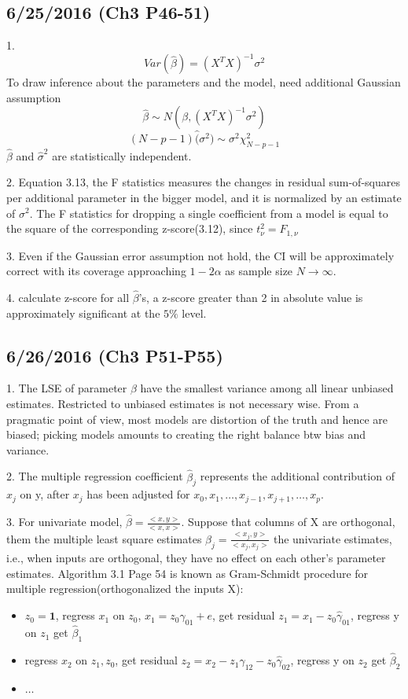 \documentclass[a4paper, 12pt]{article}
\begin{document}
\subsection*{6/25/2016 (Ch3 P46-51)}

1.$$Var(\hat{\beta})=(X^TX)^{-1}\sigma^2$$
To  draw inference about the parameters and the  model, need additional Gaussian assumption
$$\hat{\beta} \sim N(\beta,(X^TX)^{-1}\sigma^2 )$$
$$(N-p-1)\hat(\sigma^2) \sim \sigma^2\chi^2_{N-p-1}$$
$\hat{\beta}$ and $\hat{\sigma}^2$ are statistically independent.

2. Equation 3.13, the F statistics measures the changes in residual sum-of-squares per additional parameter in the bigger model, and it is normalized by an estimate of $\sigma^2$. The F statistics for dropping a single coefficient from a model is equal to the square of the corresponding z-score(3.12), since $t_{\nu}^2=F_{1,\nu}$

3. Even if the Gaussian error assumption not hold, the CI will be approximately correct with its coverage approaching $1-2\alpha$ as sample size $N \rightarrow \infty$.

4. calculate z-score for all $\hat{\beta}$'s, a z-score greater than 2 in absolute value is approximately significant at the $5\%$ level.

\subsection*{6/26/2016 (Ch3 P51-P55)}

1. The LSE of parameter $\beta$ have the smallest variance among all linear unbiased estimates. Restricted to unbiased estimates is not necessary wise. From a pragmatic point of view, most models are distortion of the truth and hence are biased; picking models amounts to creating the right balance btw bias and variance.

2. The multiple regression coefficient $\hat{\beta}_j$ represents the additional contribution of $x_j$ on y, after $x_j$ has been adjusted for $x_0,x_1,\ldots,x_{j-1},x_{j+1},\ldots,x_p$.

3. For univariate model, $\hat{\beta}=\frac{<x,y>}{<x,x>}$. Suppose that columns of X are orthogonal, them the multiple least square estimates $\beta_j=\frac{<x_j,y>}{<x_j,x_j>}$ the univariate estimates, i.e., when inputs are orthogonal, they have no effect on each other's parameter estimates. Algorithm 3.1 Page 54 is known as Gram-Schmidt procedure for multiple regression(orthogonalized the inputs X):
\begin{itemize}
	\item $z_0 =\textbf{1}$, regress $x_1$ on $z_0$, $x_1=z_0\gamma_{01} + e$, get residual $z_1=x_1-z_0\hat{\gamma}_{01}$, regress y on $z_1$ get $\hat{\beta}_1$
	\item regress $x_2$ on $z_1,z_0$, get residual $z_2=x_2-z_1\hat{\gamma}_{12}-z_0\hat{\gamma}_{02}$, regress y on $z_2$ get $\hat{\beta}_2$
	\item $\ldots$
\end{itemize}
\end{document}
